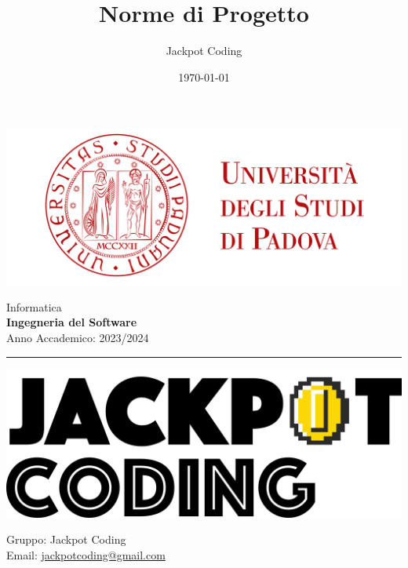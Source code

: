 \documentclass[5pt]{article}
\title{Norme di Progetto}
\author{Jackpot Coding}
\date{\today}
\begin{document}

\vspace{8pt}
\includegraphics[scale=0.2]{assets/UNIPDFull.png}

\vspace{30pt}

\begin{minipage}[t]{0.48\textwidth}
	\begin{flushleft}
		Informatica\\
		\vspace{5pt}
		\textbf{\LARGE Ingegneria del Software}\\
		Anno Accademico: 2023/2024
	\end{flushleft}
\end{minipage}


\vspace{5px}


\textcolor{black}{\rule{\textwidth}{5pt}}

\begin{minipage}[t]{0.50\textwidth}
	\begin{flushleft}
		\hspace{10pt}
		\includegraphics[scale=0.65]{assets/jackpot-logo.png} 
	\end{flushleft}
\end{minipage}
\hspace{-60pt} %
\begin{flushright}
	\begin{minipage}[t]{0.50\textwidth}
		\begin{flushright}
			Gruppo: {\Large Jackpot Coding}\\
			Email: \href{mailto:jackpotcoding@gmail.com}{jackpotcoding@gmail.com}
		\end{flushright}
	\end{minipage}
\end{flushright}
\end{document}
